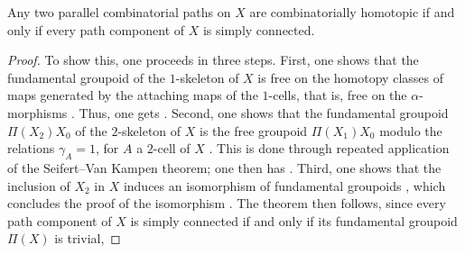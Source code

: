 
\begin{thm}
\label{thm:top-coherence}
    Any two parallel combinatorial paths on $X$ are combinatorially homotopic if and only if every path component of $X$ is simply connected.
\end{thm}

\begin{proof}
    To show this, one proceeds in three steps. 
    First, one shows that the fundamental groupoid  of the $1$-skeleton of $X$ is free on the homotopy classes of maps generated by the attaching maps of the $1$-cells, that is, free on the $\alpha$-morphisms \cite[9.1.5]{Brown2006}.
    Thus, one gets . 
    Second, one shows that the fundamental groupoid $\Pi(X_2)X_0$ of the $2$-skeleton of $X$ is the free groupoid $\Pi(X_1)X_0$ modulo the relations $\gamma_A=1$, for $A$ a $2$-cell of $X$ \cite[9.1.6]{Brown2006}. 
    This is done through repeated application of the Seifert--Van Kampen theorem; one then has .
    Third, one shows that the inclusion of $X_2$ in $X$ induces an isomorphism of fundamental groupoids  \cite[9.1.7]{Brown2006}, which concludes the proof of the isomorphism .
    The theorem then follows, since every path component of $X$ is simply connected if and only if its fundamental groupoid $\Pi(X)$ is trivial,   
\end{proof}




